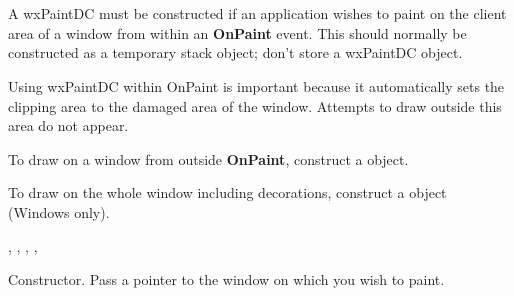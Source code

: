 \section{}\label{wxpaintdc}

A wxPaintDC must be constructed if an application wishes to paint on the
client area of a window from within an {\bf OnPaint} event.
This should normally be constructed as a temporary stack object; don't store
a wxPaintDC object.

Using wxPaintDC within OnPaint is important because it automatically
sets the clipping area to the damaged area of the window. Attempts to draw
outside this area do not appear.

To draw on a window from outside {\bf OnPaint}, construct a  object.

To draw on the whole window including decorations, construct a  object
(Windows only).




, , ,\rtfsp
{}, 




Constructor. Pass a pointer to the window on which you wish to paint.



